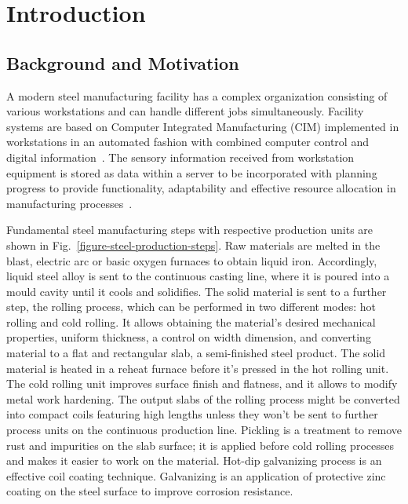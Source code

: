 \chapter{Introduction}

\section{Background and Motivation}
A modern steel manufacturing facility has a complex organization consisting of various workstations and can handle different jobs simultaneously. Facility systems are based on Computer Integrated Manufacturing (CIM) implemented in workstations in an automated fashion with combined computer control and digital information~\cite{waldner1992}. The sensory information received from workstation equipment is stored as data within a server to be incorporated with planning progress to provide functionality, adaptability and effective resource allocation in manufacturing processes~\cite{Saadaoui2019}.



Fundamental steel manufacturing steps with respective production units are shown in Fig.~\ref{figure-steel-production-steps}. Raw materials are melted in the blast, electric arc or basic oxygen furnaces to obtain liquid iron. Accordingly, liquid steel alloy is sent to the continuous casting line, where it is poured into a mould cavity until it cools and solidifies. The solid material is sent to a further step, the rolling process, which can be performed in two different modes: hot rolling and cold rolling. It allows obtaining the material's desired mechanical properties, uniform thickness, a control on width dimension, and converting material to a flat and rectangular slab, a semi-finished steel product. The solid material is heated in a reheat furnace before it's pressed in the hot rolling unit. The cold rolling unit improves surface finish and flatness, and it allows to modify metal work hardening. The output slabs of the rolling process might be converted into compact coils featuring high lengths unless they won't be sent to further process units on the continuous production line. Pickling is a treatment to remove rust and impurities on the slab surface; it is applied before cold rolling processes and makes it easier to work on the material. Hot-dip galvanizing process is an effective coil coating technique. Galvanizing is an application of protective zinc coating on the steel surface to improve corrosion resistance.

